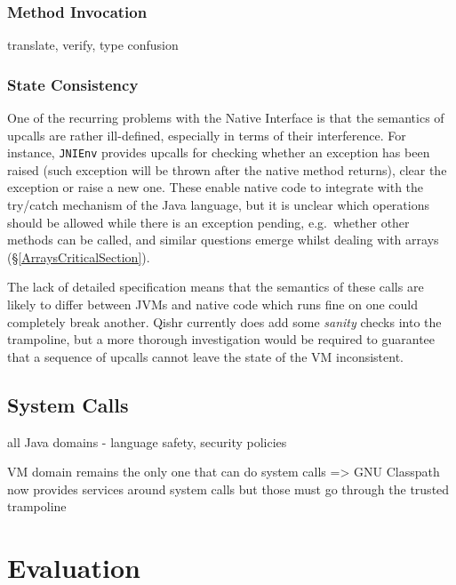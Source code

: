 \documentclass[a4paper,12pt,twoside,openright]{report}
\begin{document}
\subsection{Method Invocation}

translate, verify, type confusion

\subsection{State Consistency}

One of the recurring problems with the Native Interface is that the semantics of upcalls are rather ill-defined, especially in terms of their interference. For instance, \texttt{JNIEnv} provides upcalls for checking whether an exception has been raised (such exception will be thrown after the native method returns), clear the exception or raise a new one. These enable native code to integrate with the try/catch mechanism of the Java language, but it is unclear which operations should be allowed while there is an exception pending, e.g.\ whether other methods can be called, and similar questions emerge whilst dealing with arrays (\S\ref{ArraysCriticalSection}).

The lack of detailed specification means that the semantics of these calls are likely to differ between JVMs and native code which runs fine on one could completely break another. Qishr currently does add some \emph{sanity} checks into the trampoline, but a more thorough investigation would be required to guarantee that a sequence of upcalls cannot leave the state of the VM inconsistent.

\section{System Calls}

all Java domains - language safety, security policies

VM domain remains the only one that can do system calls => GNU Classpath now provides services around system calls but those must go through the trusted trampoline

\chapter{Evaluation} 

\end{document}
